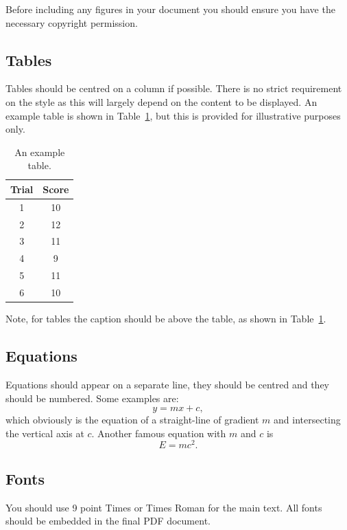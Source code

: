 \documentclass{cmppgr}
\begin{document}
Before including any figures in your document you should ensure you have the necessary copyright permission.

\subsection{Tables}

Tables should be centred on a column if possible. There is no strict requirement on the style as this will largely depend on the content to be displayed. An example table is shown in Table~\ref{tab:example}, but this is provided for illustrative purposes only.

\begin{table}[h]
\centering
\caption{An example table.}
\begin{tabular}{|c|c|}
\hline
Trial & Score \\\hline\hline
1 & 10 \\
2 & 12 \\
3 & 11 \\
4 & 9 \\
5 & 11 \\
6 & 10 \\\hline
\end{tabular}
\label{tab:example}
\end{table}

Note, for tables the caption should be above the table, as shown in Table~\ref{tab:example}.

\subsection{Equations}

Equations should appear on a separate line, they should be centred and they should be numbered. Some examples are:
%
\begin{equation}
y = mx + c,
\label{eqn:line}
\end{equation}
%
which obviously is the equation of a straight-line of gradient $m$ and intersecting the vertical axis at $c$. Another famous equation with $m$ and $c$ is
%
\begin{equation}
E = mc^2.
\label{eqn:einstein}
\end{equation}

\subsection{Fonts}

You should use 9 point Times or Times Roman for the main text. All fonts should be embedded in the final PDF document.
\end{document}
